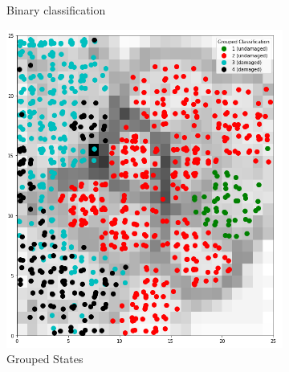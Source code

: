 \documentclass[twocolumn]{article}
\begin{document}
\begin{figure}
\begin{subfigure}{0.245\textwidth}
            \caption{Binary classification}
            \label{fig:som2_2525}
      \end{subfigure}
      \begin{subfigure}{0.245\textwidth}
            \centering
            \includegraphics[width=\textwidth]{som_4_2525.png}
            \caption{Grouped States}
            \label{fig:som4_2525}
      \end{subfigure}
      \begin{subfigure}{0.245\textwidth}
            \centering

\end{subfigure}
\end{figure}
\end{document}
